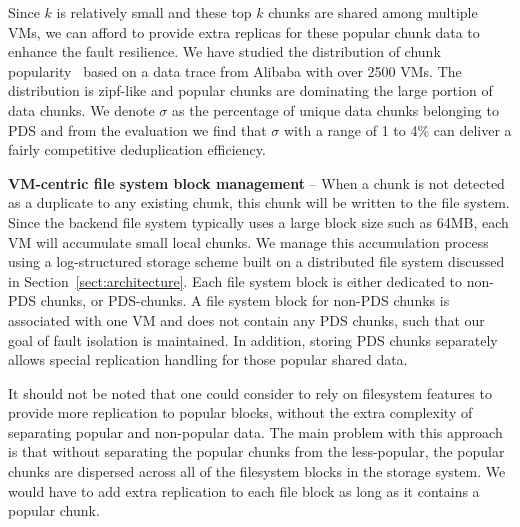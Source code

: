 Since $k$ is relatively small and these top $k$ chunks are shared among multiple VMs, 
we can afford to provide extra replicas for these popular chunk data to enhance the fault resilience.
We have studied the distribution of chunk popularity~\cite{WeiZhangIEEE} 
based on a data trace from Alibaba with over 2500 VMs.
The distribution is zipf-like and popular chunks are dominating the large portion of data chunks.
We denote $\sigma$ as the percentage of unique data chunks belonging to PDS and from the evaluation we find that
$\sigma$ with a range of 1 to 4\% can deliver a fairly competitive deduplication efficiency.


\textbf{VM-centric file system block management} --
When a chunk is not detected as a duplicate to any existing chunk, this chunk will be written
to the file system. Since the backend file system typically uses a large block size such as 64MB, each VM will 
accumulate small local chunks. We manage this accumulation process using a log-structured storage scheme built
on a distributed file system discussed in Section~\ref{sect:architecture}.
Each file system block is either dedicated to non-PDS chunks, or PDS-chunks.
A file system block for non-PDS chunks is associated with one VM and does not contain
any PDS chunks, such that our goal of fault isolation is maintained.
In addition, storing PDS chunks separately allows special replication handling for those popular shared data. 

It should not be noted that one could consider 
to rely on filesystem features to provide more replication to popular
blocks, without the extra complexity of separating popular and non-popular
data. The main problem with this  approach is that without separating the
popular chunks from the less-popular, the popular chunks are dispersed across
all of the filesystem blocks in the storage system.  We would
have to add extra replication to each file block as long as it contains a popular chunk.

